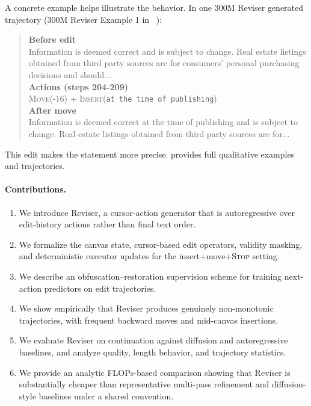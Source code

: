 \documentclass[11pt]{article}
\DeclareRobustCommand{\Stop}{\ifmmode\text{\textsc{Stop}}\else\textsc{Stop}\fi}
\begin{document}
A concrete example helps illustrate the behavior. In one 300M Reviser generated trajectory (300M Reviser Example 1 in ~):
\begin{quote}
\textbf{Before edit}\\
\ttfamily\small Information is deemed correct and is subject to change. Real estate listings obtained from third party sources are for \textbar{} consumers' personal purchasing decisions and should...
\\[0.25em]
\textbf{Actions (steps 204-209)}\\
\ttfamily\small \textcolor{FigBlue}{\textsc{Move}(-16)} \;+\; \textcolor{FigTyrianPurple}{\textsc{Insert}}(\texttt{at the time of publishing})
\\[0.25em]
\textbf{After move}\\
\ttfamily\small Information is deemed correct at the time of publishing \textbar{} and is subject to change. Real estate listings obtained from third party sources are for...
\end{quote}
This edit makes the statement more precise.  provides full qualitative examples and trajectories.

\paragraph{Contributions.}
\begin{enumerate}[leftmargin=*,itemsep=0.2em]
\item We introduce Reviser, a cursor-action generator that is autoregressive over edit-history actions rather than final text order.
\item We formalize the canvas state, cursor-based edit operators, validity masking, and deterministic executor updates for the insert+move+\Stop{} setting.
\item We describe an obfuscation--restoration supervision scheme for training next-action predictors on edit trajectories.
\item We show empirically that Reviser produces genuinely non-monotonic trajectories, with frequent backward moves and mid-canvas insertions.
\item We evaluate Reviser on continuation against diffusion and autoregressive baselines, and analyze quality, length behavior, and trajectory statistics.
\item We provide an analytic FLOPs-based comparison showing that Reviser is substantially cheaper than representative multi-pass refinement and diffusion-style baselines under a shared convention.
\end{enumerate}
\end{document}
